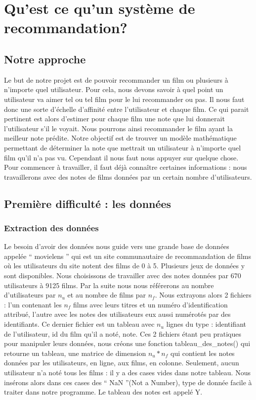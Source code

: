 \documentclass[a4paper,10pt]{article}
\begin{document}
\section{Qu'est ce qu'un système de recommandation?}

\subsection{Notre approche}

Le but de notre projet est de pouvoir recommander un film ou plusieurs à n'importe quel utilisateur. 
Pour cela, nous devons savoir à quel point un utilisateur va aimer tel ou tel film pour le lui recommander ou pas. 
Il nous faut donc une sorte d'échelle d'affinité entre l'utilisateur et chaque film. Ce qui parait pertinent est alors d'estimer pour chaque film une note que lui donnerait l'utilisateur s'il le voyait.
Nous pourrons ainsi recommander le film ayant la meilleur note prédite.
Notre objectif est de trouver un modèle mathématique permettant de déterminer la note que mettrait un utilisateur à n'importe quel film qu'il n'a pas vu. 
Cependant il nous faut nous appuyer sur quelque chose. Pour commencer à travailler, il faut déjà connaître certaines informations : nous travaillerons avec des notes de films données par un certain nombre d'utilisateurs.

\subsection{Première difficulté : les données}
\subsubsection{Extraction des données}

Le besoin d'avoir des données nous guide vers une grande base de données appelée `` movielens '' qui est un site communautaire de recommandation de films où les utilisateurs du site notent des films de 0 à 5.
Plusieurs jeux de données y sont disponibles. 
Nous choisissons de travailler avec des notes données par 670 utilisateurs à 9125 films.
Par la suite nous nous référerons au nombre d'utilisateurs par $n_u$ et au nombre de films par $n_f$.
Nous extrayons alors 2 fichiers : l’un contenant les $n_f$ films avec leurs titres et un numéro d'identification attribué,  
l’autre avec les notes des utilisateurs eux aussi numérotés par des identifiants.
Ce dernier fichier est un tableau avec $n_u$ lignes du type : identifiant de l’utilisateur, id du film qu’il a noté, note. 
Ces 2 fichiers étant peu pratiques pour manipuler leurs données,  
nous créons une fonction tableau\_des\_notes() qui retourne un tableau, une matrice de dimension $n_u * n_f$ qui contient les notes données par les utilisateurs, en ligne, aux films, en colonne. Seulement, aucun utilisateur n'a noté tous les films : il y a des cases vides dans notre tableau. Nous insérons alors dans ces cases des `` NaN ''(Not a Number), type de donnée facile à traiter dans notre programme.
Le tableau des notes est appelé Y.
\end{document}
